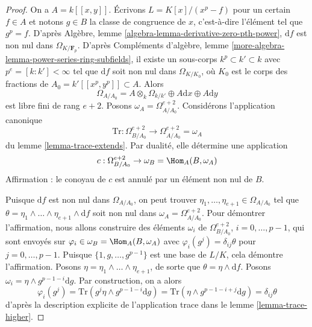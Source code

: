 \begin{proof} On a $A = k[[x, y]]$. Écrivons $L = K[x]/(x^p - f)$ pour un certain $f \in A$ et notons $g \in B$ la classe de congruence de $x$, c'est-à-dire l'élément tel que $g^p = f$. D'après Algèbre, lemme \ref{algebra-lemma-derivative-zero-pth-power}, $\text{d}f$ est non nul dans $\Omega_{K/\mathbf{F}_p}$. D'après Compléments d'algèbre, lemme \ref{more-algebra-lemma-power-series-ring-subfields}, il existe un sous-corps $k^p \subset k' \subset k$ avec $p^e = [k : k'] < \infty$ tel que $\text{d}f$ soit non nul dans $\Omega_{K/K_0}$, où $K_0$ est le corps des fractions de $A_0 = k'[[x^p, y^p]] \subset A$. Alors $$
\Omega_{A/A_0} =
A \otimes_k \Omega_{k/k'} \oplus A \text{d}x \oplus A \text{d}y
$$ est libre fini de rang $e + 2$. Posons $\omega_A = \Omega^{e + 2}_{A/A_0}$. Considérons l'application canonique $$
\text{Tr} :
\Omega^{e + 2}_{B/A_0}
\longrightarrow
\Omega^{e + 2}_{A/A_0} = \omega_A
$$ du lemme \ref{lemma-trace-extends}. Par dualité, elle détermine une application $$
c : \Omega^{e + 2}_{B/A_0} \to \omega_B = \Hom_A(B, \omega_A)
$$ Affirmation : le conoyau de $c$ est annulé par un élément non nul de $B$.

\medskip\noindent Puisque $\text{d}f$ est non nul dans $\Omega_{A/A_0}$, on peut trouver $\eta_1, \ldots, \eta_{e + 1} \in \Omega_{A/A_0}$ tel que $\theta = \eta_1 \wedge \ldots \wedge \eta_{e + 1} \wedge \text{d}f$ soit non nul dans $\omega_A = \Omega^{e + 2}_{A/A_0}$. Pour démontrer l'affirmation, nous allons construire des éléments $\omega_i$ de $\Omega^{e + 2}_{B/A_0}$, $i = 0, \ldots, p - 1$, qui sont envoyés sur $\varphi_i \in \omega_B = \Hom_A(B, \omega_A)$ avec $\varphi_i(g^j) = \delta_{ij}\theta$ pour $j = 0, \ldots, p - 1$. Puisque $\{1, g, \ldots, g^{p - 1}\}$ est une base de $L/K$, cela démontre l'affirmation. Posons $\eta = \eta_1 \wedge \ldots \wedge \eta_{e + 1}$, de sorte que $\theta = \eta \wedge \text{d}f$. Posons $\omega_i = \eta \wedge g^{p - 1 - i}\text{d}g$. Par construction, on a alors $$
\varphi_i(g^j) = \text{Tr}(g^j \eta \wedge g^{p - 1 - i}\text{d}g) =
\text{Tr}(\eta \wedge g^{p - 1 - i + j}\text{d}g) = \delta_{ij} \theta
$$ d'après la description explicite de l'application trace dans le lemme \ref{lemma-trace-higher}.


\end{proof}
